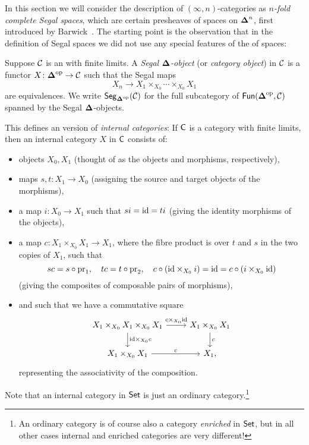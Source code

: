 \documentclass[a4paper,11pt]{article}
\begin{document}
In this section we will consider the description of
$(\infty,n)$-categories as \emph{$n$-fold complete Segal spaces}, which
are certain presheaves of spaces on $\boldsymbol{\Delta}^{n}$, first introduced by
Barwick~\cite{BarwickThesis}. The starting point is the observation
that in the definition of Segal spaces we did not use any special
features of the \icat{} of spaces:
\begin{defn}
  Suppose $\mathcal{C}$ is an \icat{} with finite limits. A \emph{Segal
    $\boldsymbol{\Delta}$-object} (or \emph{category object}) in $\mathcal{C}$ is a functor
  $X \colon \Dop \to \eC$ such that the Segal maps
  \[ X_{n} \to X_{1} \times_{X_{0}} \cdots \times_{X_{0}} X_{1}\]
  are equivalences. We write $\textup{\textsf{Seg}}_{\boldsymbol{\Delta}^{\text{\textup{op}}}}(\mathcal{C})$ for the full
  subcategory of $\textup{\textsf{Fun}}(\boldsymbol{\Delta}^{\text{\textup{op}}}, \mathcal{C})$ spanned by the Segal $\boldsymbol{\Delta}$-objects.
\end{defn}
\begin{remark}
  This defines an \icatl{} version of \emph{internal categories}: If
  $\textup{\textsf{C}}$ is a category with finite limits, then an internal category
  $X$ in $\textup{\textsf{C}}$ consists of:
  \begin{itemize}
  \item objects $X_{0}, X_{1}$ (thought of as the objects and
    morphisms, respectively),
  \item maps $s,t \colon X_{1} \to X_{0}$ (assigning the source and target
    objects of the morphisms),
  \item a map $i \colon X_{0} \to X_{1}$ such that $si = \text{\textup{id}} = ti$
    (giving the identity morphisms of the objects),
  \item a map $c \colon X_{1} \times_{X_{0}} X_{1} \to X_{1}$, where the
    fibre product is over $t$ and $s$ in the two copies of $X_{1}$, such that
    \[ sc = s\circ \text{\textup{pr}}_{1}, \quad tc = t \circ \text{\textup{pr}}_{2},
      \quad
      c \circ (\text{\textup{id}} \times_{X_{0}} i) = \text{\textup{id}} = c \circ (i \times_{X_{0}}
      \text{\textup{id}})\]
      (giving
    the composites of composable pairs of morphisms),
  \item and such that we have a commutative square
    \[
      \begin{tikzcd}
        X_{1} \times_{X_{0}} X_{1} \times_{X_{0}} X_{1} \ar[r, "c
        \times_{X_{0}} \id"] \ar[d, "\id \times_{X_{0}} c"] &  X_{1}
        \times_{X_{0}} X_{1} \ar[d, "c"] \\
         X_{1} \times_{X_{0}} X_{1} \ar[r, "c"] & X_{1},
       \end{tikzcd}
     \]
     representing the associativity of the composition.
   \end{itemize}
   Note that an internal category in $\textup{\textsf{Set}}$ is just an ordinary
   category.\footnote{An ordinary category is of course also a category
   \emph{enriched} in $\textup{\textsf{Set}}$, but in all other cases internal and
   enriched categories are very different!}
\end{remark}
\end{document}
